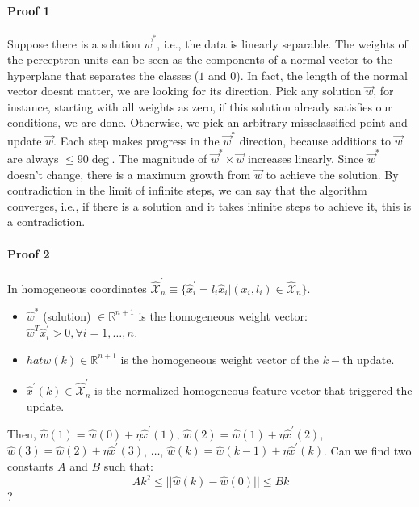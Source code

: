 \documentclass[main]{subfiles}
\begin{document}
\paragraph{Proof 1}
Suppose there is a solution $\vec{w}^*$, i.e., the data is linearly separable.
The weights of the perceptron units can be seen as the components of a normal vector to the hyperplane that separates the classes ($1$ and $0$).
In  fact, the  length of the normal vector doesnt matter, we are looking for its direction.
Pick any solution $\vec{w}$, for instance, starting with all weights as zero, if this solution already satisfies our conditions, we are done.
Otherwise, we pick an arbitrary missclassified point and update $\vec{w}$.
Each step makes progress in the $\vec{w}^*$ direction, because additions to $\vec{w}$ are always $\leq 90\deg$.
The magnitude of $\vec{w}^* \times \vec{w}$ increases linearly.
Since $\vec{w}^*$ doesn't change, there is a maximum growth from $\vec{w}$ to achieve the solution.
By contradiction in the limit of infinite steps, we can say that the algorithm converges, i.e., if there is a solution and it takes infinite steps to achieve it, this is a contradiction.

\paragraph{Proof 2}
In homogeneous coordinates $\mathcal{\hat{X}}^{\prime}_{n} \equiv \{ \hat{x}^{\prime}_{i} = l_i \hat{x}_i | (x_i, l_i) \in \mathcal{\hat{X}}_{n} \}$.
\begin{itemize}
\item $\hat{w}^{*}$ (solution) $\in \mathbb{R}^{n+1}$ is the homogeneous weight vector: $\hat{w}^T \hat{x}^{\prime}_i > 0, \forall i = 1, \dots, n$.
\item $hat{w}(k) \in \mathbb{R}^{n+1}$ is the homogeneous weight vector of the $k-$th update.
\item $\hat{x}^{\prime}(k) \in \mathcal{\hat{X}}^{\prime}_n$ is the normalized homogeneous feature vector that triggered the update.
\end{itemize}
Then, $\hat{w}(1) = \hat{w}(0) + \eta \hat{x}^{\prime}(1)$, $\hat{w}(2) = \hat{w}(1) + \eta \hat{x}^{\prime}(2)$, $\hat{w}(3) = \hat{w}(2) + \eta \hat{x}^{\prime}(3)$, $\dots$, $\hat{w}(k) = \hat{w}(k-1) + \eta \hat{x}^{\prime}(k)$.
Can we find two constants $A$ and $B$ such that:
\begin{equation}
Ak^2 \leq || \hat{w}(k) - \hat{w}(0) || \leq Bk
\label{eq:convergence}
\end{equation}
?
\end{document}
